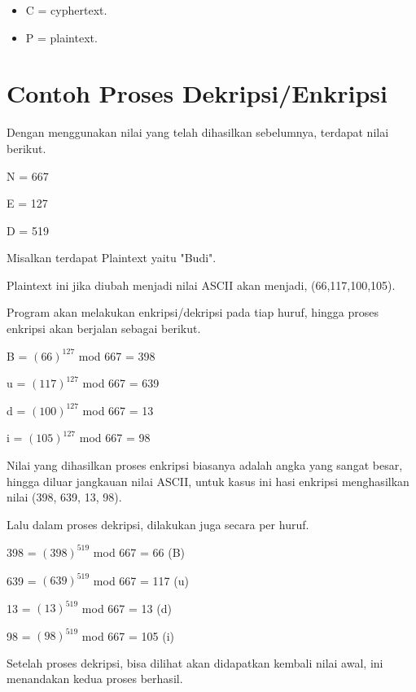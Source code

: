 \documentclass[11pt, a4paper]{article}
\begin{document}
\begin{itemize}
  \item C = cyphertext.
  \item P = plaintext.
\end{itemize}

\section*{Contoh Proses Dekripsi/Enkripsi}

Dengan menggunakan nilai yang telah dihasilkan sebelumnya, terdapat nilai berikut.

\begin{center}
N = 667

E = 127

D = 519
\end{center}

Misalkan terdapat Plaintext yaitu "Budi".

Plaintext ini jika diubah menjadi nilai ASCII akan menjadi, (66,117,100,105).

Program akan melakukan enkripsi/dekripsi pada tiap huruf, hingga proses enkripsi
akan berjalan sebagai berikut.

\begin{center}
B = $(66)^{127}$ mod 667 = 398

u = $(117)^{127}$ mod 667 = 639

d = $(100)^{127}$ mod 667 = 13

i = $(105)^{127}$ mod 667 = 98
\end{center}

Nilai yang dihasilkan proses enkripsi biasanya adalah angka yang sangat besar,
hingga diluar jangkauan nilai ASCII, untuk kasus ini hasi enkripsi menghasilkan nilai
(398, 639, 13, 98).

Lalu dalam proses dekripsi, dilakukan juga secara per huruf.

\begin{center}
398 = $(398)^{519}$ mod 667 = 66 (B)

639 = $(639)^{519}$ mod 667 = 117 (u)

13 = $(13)^{519}$ mod 667 = 13 (d)

98 = $(98)^{519}$ mod 667 = 105 (i)
\end{center}

Setelah proses dekripsi, bisa dilihat akan didapatkan kembali nilai awal,
ini menandakan kedua proses berhasil.
\end{document}
